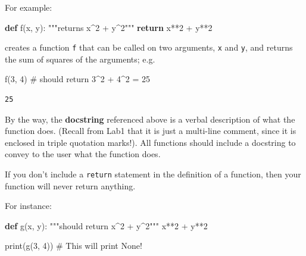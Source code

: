 \documentclass[
  11pt,
]{article}
\newenvironment{Shaded}{\begin{snugshade}}{\end{snugshade}}
\newcommand{\BuiltInTok}[1]{\textcolor[rgb]{0.00,0.23,0.31}{#1}}
\newcommand{\CommentTok}[1]{\textcolor[rgb]{0.37,0.37,0.37}{#1}}
\newcommand{\ControlFlowTok}[1]{\textcolor[rgb]{0.00,0.23,0.31}{\textbf{#1}}}
\newcommand{\DecValTok}[1]{\textcolor[rgb]{0.68,0.00,0.00}{#1}}
\newcommand{\KeywordTok}[1]{\textcolor[rgb]{0.00,0.23,0.31}{\textbf{#1}}}
\newcommand{\NormalTok}[1]{\textcolor[rgb]{0.00,0.23,0.31}{#1}}
\newcommand{\OperatorTok}[1]{\textcolor[rgb]{0.37,0.37,0.37}{#1}}
\begin{document}
For example:

\begin{Shaded}
\begin{Highlighting}[]
\KeywordTok{def}\NormalTok{ f(x, y):}
    \CommentTok{"""returns x\^{}2 + y\^{}2"""}
    \ControlFlowTok{return}\NormalTok{ x}\OperatorTok{**}\DecValTok{2} \OperatorTok{+}\NormalTok{ y}\OperatorTok{**}\DecValTok{2}
\end{Highlighting}
\end{Shaded}

creates a function \texttt{f} that can be called on two arguments,
\texttt{x} and \texttt{y}, and returns the sum of squares of the
arguments; e.g.

\begin{Shaded}
\begin{Highlighting}[]
\NormalTok{f(}\DecValTok{3}\NormalTok{, }\DecValTok{4}\NormalTok{)  }\CommentTok{\# should return 3\^{}2 + 4\^{}2 = 25}
\end{Highlighting}
\end{Shaded}

\begin{verbatim}
25
\end{verbatim}

By the way, the \textbf{docstring} referenced above is a verbal
description of what the function does. (Recall from Lab1 that it is just
a multi-line comment, since it is enclosed in triple quotation marks!).
All functions should include a docstring to convey to the user what the
function does.

\begin{tcolorbox}[enhanced jigsaw, bottomrule=.15mm, colframe=quarto-callout-important-color-frame, coltitle=black, left=2mm, title=\textcolor{quarto-callout-important-color}{\faExclamation}\hspace{0.5em}{Important}, opacityback=0, opacitybacktitle=0.6, leftrule=.75mm, breakable, bottomtitle=1mm, toprule=.15mm, rightrule=.15mm, arc=.35mm, titlerule=0mm, colback=white, toptitle=1mm, colbacktitle=quarto-callout-important-color!10!white]

If you don't include a \texttt{return} statement in the definition of a
function, then your function will never return anything.

\end{tcolorbox}

For instance:

\begin{Shaded}
\begin{Highlighting}[]
\KeywordTok{def}\NormalTok{ g(x, y):}
    \CommentTok{"""should return x\^{}2 + y\^{}2"""}
\NormalTok{    x}\OperatorTok{**}\DecValTok{2} \OperatorTok{+}\NormalTok{ y}\OperatorTok{**}\DecValTok{2}

\BuiltInTok{print}\NormalTok{(g(}\DecValTok{3}\NormalTok{, }\DecValTok{4}\NormalTok{))  }\CommentTok{\# This will print None!}
\end{Highlighting}
\end{Shaded}
\end{document}
